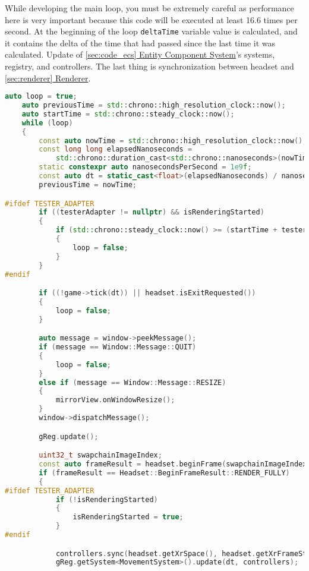 \newpage
\label{main_loop}
While developing the main loop, you must be extremely careful as performance here is very important because this code will be executed at least 16.6 times per second. At the beginning of the loop \texttt{deltaTime} variable value is calculated, and it contains the delta of the time that had passed since the last time it was calculated. Update of \hyperref[sec:code_ecs]{\ref*{sec:code_ecs} Entity Component System}'s systems, registry, and controllers. The last thing is synchronization between headset and \hyperref[sec:renderer]{\ref*{sec:renderer} Renderer}.
\begin{lstlisting}[language=c++, caption=Engine main loop (./engine/src/core/core.cpp)]
    auto loop = true;
    auto previousTime = std::chrono::high_resolution_clock::now();
    auto startTime = std::chrono::steady_clock::now();
    while (loop)
    {
        const auto nowTime = std::chrono::high_resolution_clock::now();
        const long long elapsedNanoseconds =
            std::chrono::duration_cast<std::chrono::nanoseconds>(nowTime - previousTime).count();
        static constexpr auto nanosecondsPerSecond = 1e9f;
        const auto dt = static_cast<float>(elapsedNanoseconds) / nanosecondsPerSecond;
        previousTime = nowTime;

#ifdef TESTER_ADAPTER 
        if ((testerAdapter != nullptr) && isRenderingStarted)
        {
            if (std::chrono::steady_clock::now() >= (startTime + testerAdapter->renderingDuration))
            {
                loop = false;
            }
        }
#endif

        if ((!game->tick(dt)) || headset.isExitRequested())
        {
            loop = false;
        }

        auto message = window->peekMessage();
        if (message == Window::Message::QUIT)
        {
            loop = false;
        }
        else if (message == Window::Message::RESIZE)
        {
            mirrorView.onWindowResize();
        }
        window->dispatchMessage();

        gReg.update();

        uint32_t swapchainImageIndex;
        const auto frameResult = headset.beginFrame(swapchainImageIndex);
        if (frameResult == Headset::BeginFrameResult::RENDER_FULLY)
        {
#ifdef TESTER_ADAPTER
            if (!isRenderingStarted)
            {
                isRenderingStarted = true;
            }
#endif

            controllers.sync(headset.getXrSpace(), headset.getXrFrameState().predictedDisplayTime);
            gReg.getSystem<MovementSystem>().update(dt, controllers);


\end{lstlisting}
